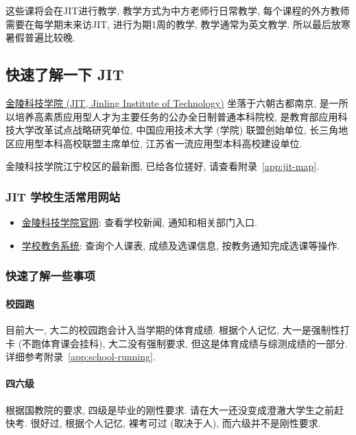 \documentclass[UTF8,a4paper,12pt]{ctexart}
\newif\ifcourseopen
\newif\ifcourseheaderprinted
\newcounter{courseitem}
\newcommand{\finishcourse}{%
 \ifcourseopen
 \par\end{minipage}\end{tcolorbox}%
 \courseopenfalse
 \fi
}
\newcommand{\coursereset}{\finishcourse\setcounter{courseitem}{0}\courseheaderprintedfalse}
\newcommand{\official}[2]{\href{#1}{#2}}
\let\origsubsection\subsection
\renewcommand{\subsection}{\coursereset\origsubsection}
\let\origsubsubsection\subsubsection
\renewcommand{\subsubsection}{\coursereset\origsubsubsection}
\let\orignewpage\newpage
\renewcommand{\newpage}{\finishcourse\orignewpage}
\begin{document}
这些课将会在JIT进行教学, 教学方式为中方老师行日常教学, 每个课程的外方教师需要在每学期末来访JIT, 进行为期1周的教学, 教学通常为英文教学. 所以最后放寒暑假普遍比较晚.




\newpage
\subsection{快速了解一下 JIT}

\official{https://www.jit.edu.cn/xxgk/xxjj.htm}{金陵科技学院 (JIT, Jinling Institute of Technology)} 坐落于六朝古都南京, 是一所以培养高素质应用型人才为主要任务的公办全日制普通本科院校, 是教育部应用科技大学改革试点战略研究单位, 中国应用技术大学 (学院) 联盟创始单位, 长三角地区应用型本科高校联盟主席单位, 江苏省一流应用型本科高校建设单位.

金陵科技学院江宁校区的最新图, 已给各位搓好, 请查看附录~\ref{app:jit-map}. 


\subsubsection{JIT 学校生活常用网站}

\begin{itemize}[itemsep=0.1em,topsep=0.25em,parsep=0pt,partopsep=0pt]
 \item \official{https://www.jit.edu.cn/}{金陵科技学院官网}: 查看学校新闻, 通知和相关部门入口.
 \item \official{https://jwxt.jit.edu.cn/default2.aspx}{学校教务系统}: 查询个人课表, 成绩及选课信息, 按教务通知完成选课等操作.
\end{itemize}

\subsubsection{快速了解一些事项}

\paragraph{校园跑} 目前大一, 大二的校园跑会计入当学期的体育成绩. 根据个人记忆, 大一是强制性打卡 (不跑体育课会挂科), 大二没有强制要求, 但这是体育成绩与综测成绩的一部分. 详细参考附录~\ref{app:school-running}.
\paragraph{四六级} 根据国教院的要求, 四级是毕业的刚性要求. 请在大一还没变成澄澈大学生之前赶快考. 很好过, 根据个人记忆, 裸考可过 (取决于人), 而六级并不是刚性要求.
\end{document}
